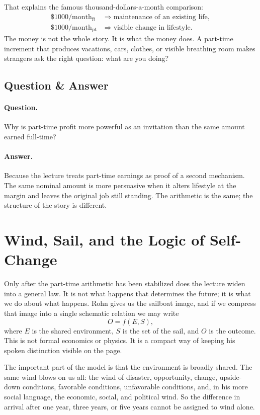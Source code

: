 That explains the famous thousand-dollars-a-month comparison:
\begin{align}
\$1000/\text{month}_{\mathrm{ft}} &\Rightarrow \text{maintenance of an existing life},\\
\$1000/\text{month}_{\mathrm{pt}} &\Rightarrow \text{visible change in lifestyle}.
\end{align}
The money is not the whole story. It is what the money does. A part-time increment that produces vacations, cars, clothes, or visible breathing room makes strangers ask the right question: what are you doing?

\subsection{Question \& Answer}

\paragraph{Question.} Why is part-time profit more powerful as an invitation than the same amount earned full-time?

\paragraph{Answer.} Because the lecture treats part-time earnings as proof of a second mechanism. The same nominal amount is more persuasive when it alters lifestyle at the margin and leaves the original job still standing. The arithmetic is the same; the structure of the story is different.

\section{Wind, Sail, and the Logic of Self-Change}

Only after the part-time arithmetic has been stabilized does the lecture widen into a general law. It is not what happens that determines the future; it is what we do about what happens. Rohn gives us the sailboat image, and if we compress that image into a single schematic relation we may write
\begin{equation}
O = f(E,S),
\end{equation}
where \(E\) is the shared environment, \(S\) is the set of the sail, and \(O\) is the outcome. This is not formal economics or physics. It is a compact way of keeping his spoken distinction visible on the page.

The important part of the model is that the environment is broadly shared. The same wind blows on us all: the wind of disaster, opportunity, change, upside-down conditions, favorable conditions, unfavorable conditions, and, in his more social language, the economic, social, and political wind. So the difference in arrival after one year, three years, or five years cannot be assigned to wind alone.

